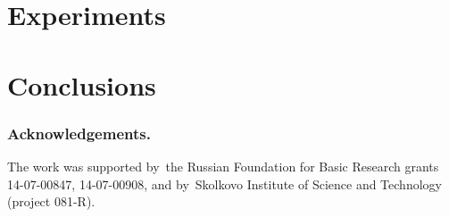 \documentclass{llncs}
\begin{document}
\section{Experiments}
\label{sec:Experiments}

\section{Conclusions}
\label{sec:Conclusions}

\bigskip
\subsubsection*{Acknowledgements.}
    The work was supported by~the Russian Foundation for Basic Research grants 14-07-00847, 14-07-00908,
    and by~Skolkovo Institute of Science and Technology (project 081-R).

%


\end{document}
